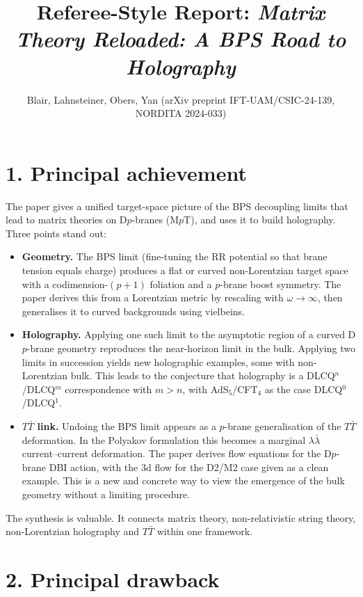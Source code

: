 \documentclass[11pt]{article}
\title{Referee-Style Report: \emph{Matrix Theory Reloaded: A BPS Road to Holography}}
\author{Blair, Lahnsteiner, Obers, Yan (arXiv preprint IFT-UAM/CSIC-24-139, NORDITA 2024-033)}
\date{}
\begin{document}
\maketitle

\section*{1. Principal achievement}

The paper gives a unified target-space picture of the BPS decoupling limits that lead to matrix theories on D$p$-branes (M$p$T), and uses it to build holography. Three points stand out:

\begin{itemize}
  \item \textbf{Geometry.} The BPS limit (fine-tuning the RR potential so that brane tension equals charge) produces a flat or curved non-Lorentzian target space with a codimension-$(p+1)$ foliation and a $p$-brane boost symmetry. The paper derives this from a Lorentzian metric by rescaling with $\omega \to \infty$, then generalises it to curved backgrounds using vielbeins.
  \item \textbf{Holography.} Applying one such limit to the asymptotic region of a curved D$p$-brane geometry reproduces the near-horizon limit in the bulk. Applying two limits in succession yields new holographic examples, some with non-Lorentzian bulk. This leads to the conjecture that holography is a DLCQ$^n$/DLCQ$^m$ correspondence with $m>n$, with AdS$_5$/CFT$_4$ as the case DLCQ$^0$/DLCQ$^1$.
  \item \textbf{$T\bar T$ link.} Undoing the BPS limit appears as a $p$-brane generalisation of the $T\bar T$ deformation. In the Polyakov formulation this becomes a marginal $\lambda\bar\lambda$ current--current deformation. The paper derives flow equations for the D$p$-brane DBI action, with the 3d flow for the D2/M2 case given as a clean example. This is a new and concrete way to view the emergence of the bulk geometry without a limiting procedure.
\end{itemize}

The synthesis is valuable. It connects matrix theory, non-relativistic string theory, non-Lorentzian holography and $T\bar T$ within one framework.

\section*{2. Principal drawback}
\end{document}
